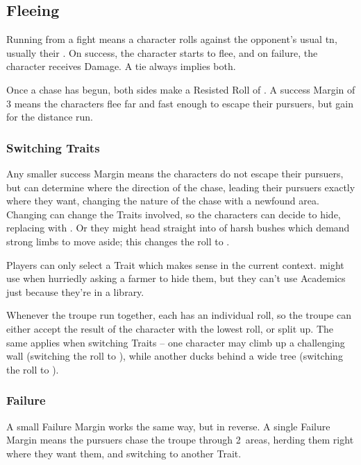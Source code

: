 \begin{multicols}{2}

\subsection{Fleeing}

Running from a fight means a character rolls  against the opponent's usual \gls{tn}, usually their .
On success, the character starts to flee, and on failure, the character receives Damage.
A tie always implies both.

Once a chase has begun, both sides make a Resisted Roll of .
A success Margin of 3 means the characters flee far and fast enough to escape their pursuers, but gain  for the distance run.

\subsubsection{Switching Traits}

Any smaller success Margin means the characters do not escape their pursuers, but can determine where the direction of the chase, leading their pursuers exactly where they want, changing the nature of the chase with a newfound \gls{area}.
Changing  can change the Traits involved, so the characters can decide to hide, replacing  with .
Or they might head straight into  of harsh bushes which demand strong limbs to move aside; this changes the roll to .

Players can only select a Trait which makes sense in the current context.
 might use  when hurriedly asking a farmer to hide them, but they can't use Academics just because they're in a library.

Whenever the troupe run together, each has an individual roll, so the troupe can either accept the result of the character with the lowest roll, or split up.
The same applies when switching Traits -- one character may climb up a challenging wall (switching the roll to ), while another ducks behind a wide tree (switching the roll to ).

\subsubsection{Failure}
A small Failure Margin works the same way, but in reverse.
A single Failure Margin means the pursuers chase the troupe through 2~\glspl{area}, herding them right where they want them, and switching to another Trait.


\end{multicols}
